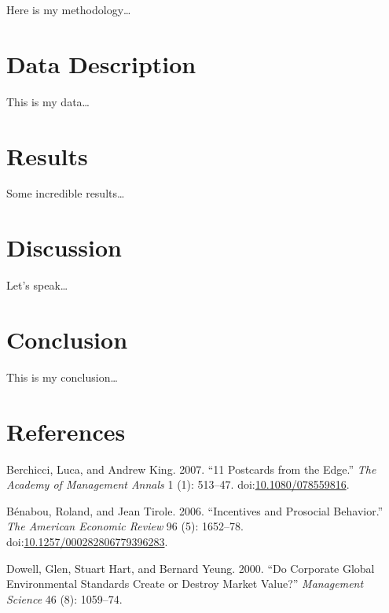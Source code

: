 \documentclass[12pt,]{article}
\begin{document}
Here is my methodology\ldots{}

\FloatBarrier
\newpage

\section{Data Description}\label{data-description}

This is my data\ldots{}

\FloatBarrier
\newpage

\section{Results}\label{results}

Some incredible results\ldots{}

\FloatBarrier
\newpage

\section{Discussion}\label{discussion}

Let's speak\ldots{}

\FloatBarrier
\newpage

\section*{Conclusion}\label{conclusion}

This is my conclusion\ldots{}

\newpage

\section*{References}\label{references}

\hypertarget{refs}{}
\hypertarget{ref-Berchicci11PostcardsEdge2007}{}
Berchicci, Luca, and Andrew King. 2007. ``11 Postcards from the Edge.''
\emph{The Academy of Management Annals} 1 (1): 513--47.
doi:\href{https://doi.org/10.1080/078559816}{10.1080/078559816}.

\hypertarget{ref-BenabouIncentivesProsocialBehavior2006}{}
Bénabou, Roland, and Jean Tirole. 2006. ``Incentives and Prosocial
Behavior.'' \emph{The American Economic Review} 96 (5): 1652--78.
doi:\href{https://doi.org/10.1257/000282806779396283}{10.1257/000282806779396283}.

\hypertarget{ref-Dowell2000}{}
Dowell, Glen, Stuart Hart, and Bernard Yeung. 2000. ``Do Corporate
Global Environmental Standards Create or Destroy Market Value?''
\emph{Management Science} 46 (8): 1059--74.
\end{document}
